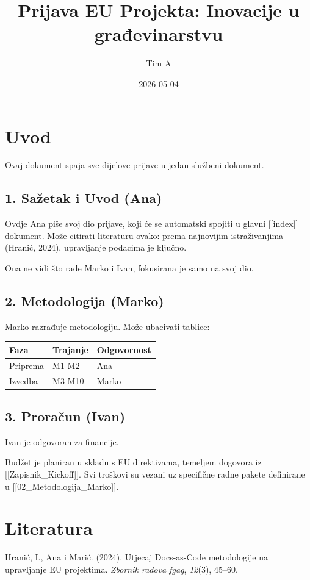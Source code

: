 \documentclass[
  croatian,
  11pt,
  a4paper,
]{article}
\title{Prijava EU Projekta: Inovacije u građevinarstvu}
\author{Tim A}
\date{2026-05-04}
\newcounter{none} %
\newlength{\cslhangindent}
\newenvironment{CSLReferences}[2] %
 {\begin{list}{}{%
  \setlength{\itemindent}{0pt}
  \setlength{\leftmargin}{0pt}
  \setlength{\parsep}{0pt}
  \ifodd #1
   \setlength{\leftmargin}{\cslhangindent}
   \setlength{\itemindent}{-1\cslhangindent}
  \fi
  \setlength{\itemsep}{#2\baselineskip}}}
 {\end{list}}
\renewcommand*\contentsname{Table of contents}
\newcommand\contentsname{Table of contents}
\begin{document}
\maketitle

\renewcommand*\contentsname{Sadržaj}
{
\setcounter{tocdepth}{3}
\tableofcontents
}

\section{Uvod}\label{uvod}

Ovaj dokument spaja sve dijelove prijave u jedan službeni dokument.

\subsection{1. Sažetak i Uvod (Ana)}\label{saux17eetak-i-uvod-ana}

Ovdje Ana piše svoj dio prijave, koji će se automatski spojiti u glavni
{[}{[}index{]}{]} dokument. Može citirati literaturu ovako: prema
najnovijim istraživanjima (Hranić, 2024), upravljanje podacima je
ključno.

Ona ne vidi što rade Marko i Ivan, fokusirana je samo na svoj dio.

\subsection{2. Metodologija (Marko)}\label{metodologija-marko}

Marko razrađuje metodologiju. Može ubacivati tablice:

{\def\LTcaptype{none} %
\begin{longtable}[]{@{}lll@{}}
\toprule\noalign{}
Faza & Trajanje & Odgovornost \\
\midrule\noalign{}
\endhead
\bottomrule\noalign{}
\endlastfoot
Priprema & M1-M2 & Ana \\
Izvedba & M3-M10 & Marko \\
\end{longtable}
}

\subsection{3. Proračun (Ivan)}\label{proraux10dun-ivan}

Ivan je odgovoran za financije.

Budžet je planiran u skladu s EU direktivama, temeljem dogovora iz
{[}{[}Zapisnik\_Kickoff{]}{]}. Svi troškovi su vezani uz specifične
radne pakete definirane u {[}{[}02\_Metodologija\_Marko{]}{]}.

\section{Literatura}\label{literatura}

\protect{}\label{refs}
\begin{CSLReferences}{1}{0}
Hranić, I., Ana i Marić. (2024). Utjecaj Docs-as-Code metodologije na
upravljanje EU projektima. \emph{Zbornik radova fgag}, \emph{12}(3),
45--60.

\end{CSLReferences}
\end{document}
